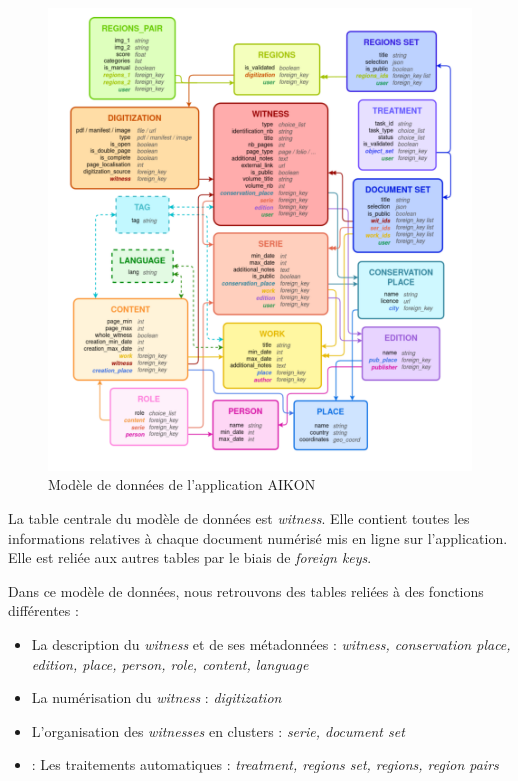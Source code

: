 \begin{figure}[H]
	\centering
	\includegraphics[width=1\textwidth]{images/modele_donnees_aikon.png}
	\caption{Modèle de données de l'application AIKON}
	\label{fig:modele_donnees}
\end{figure}

La table centrale du modèle de données est \textit{witness}. Elle contient toutes les informations relatives à chaque document numérisé mis en ligne sur l'application. Elle est reliée aux autres tables par le biais de \textit{foreign keys}. 

Dans ce modèle de données, nous retrouvons des tables reliées à des fonctions différentes : 
\begin{itemize}
	\item La description du \textit{witness} et de ses métadonnées : \textit{witness, conservation place, edition, place, person, role, content, language}
	\item La numérisation du \textit{witness} : \textit{digitization}
	\item L'organisation des \textit{witnesses} en clusters : \textit{serie, document set}
	\item : Les traitements automatiques : \textit{treatment, regions set, regions, region pairs} 
\end{itemize}

